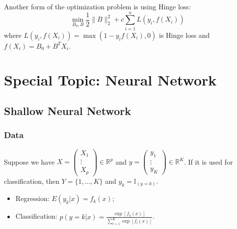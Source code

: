 \documentclass[12pt]{book}
\theoremstyle{definition}
\theoremstyle{remark}
\newcommand{\R}{\mathbb{R}}
\begin{document}
Another form of the optimization problem is using Hinge loss:
\[\min_{B_0,B} \frac12\|B\|_2^2+c\sum_{i=1}^nL(y_i,f(X_i))\]
where $L(y_i, f(X_i)) = \max(1-y_if(X_i), 0)$ is Hinge loss and $f(X_i) = B_0 + B^TX_i$.






 
 
\newpage
\chapter{Special Topic: Neural Network}
\section{Shallow Neural Network}
\subsection{Data}
Suppose we have $X = \begin{pmatrix}X_1
 \\\vdots
 \\X_p
\end{pmatrix} \in \R^p$ and $y = \begin{pmatrix}y_1
 \\\vdots
 \\y_K
\end{pmatrix} \in \R^K$. If it is used for classification, then $Y = \{1,\dots, K\}$ and $y_k = \mathbb{I}_{(y=k)}$.\\

\begin{itemize}
    \item Regression: $E(y_k|x) = f_k(x)$;
    \item Classification: $p(y = k|x) = \frac{\exp[f_k(x)]}{\sum_{l=1}^K \exp[f_l(x)]}$.
\end{itemize}
\end{document}
